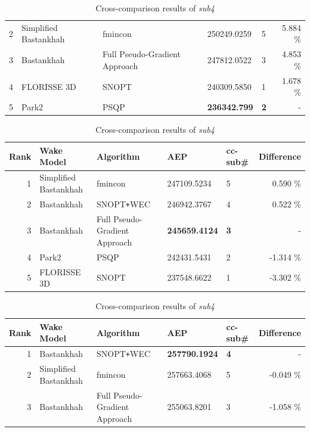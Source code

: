 \begin{table}[htbp]
\begin{center}
\begin{tabular}{r l l l l r}
						2 		& Simplified Bastankhah	& fmincon										& 250249.0259			& 5 		& 5.884 \%\\
						3		& Bastankhah			& Full Pseudo-Gradient Approach					& 247812.0522			& 3 		& 4.853 \%\\
						4		& FLORISSE 3D			& SNOPT											& 240309.5850			& 1 		& 1.678 \%\\
						5		& Park2					& PSQP											& \textbf{236342.799}	& \textbf{2}& - \\
					\hline
				\end{tabular}
			\end{center}
			\begin{center}
			\caption{Cross-comparison results of \textit{sub3}}
			\label{tab:sub3cc}
				\begin{tabular}{r l l l l r}
					\hline
					Rank		& Wake Model 			& Algorithm										& AEP					& cc-sub\#	& Difference	\\
					\hline
						1 		& Simplified Bastankhah	& fmincon										& 247109.5234			& 5 		& 0.590 \%\\	
						2 		& Bastankhah			& SNOPT\texttt{+}WEC 							& 246942.3767			& 4 		& 0.522 \%\\
						3		& Bastankhah			& Full Pseudo-Gradient Approach					& \textbf{245659.4124}	& \textbf{3}& - \\
						4		& Park2					& PSQP											& 242431.5431			& 2 		&-1.314 \%\\
						5		& FLORISSE 3D			& SNOPT											& 237548.6622			& 1 		&-3.302 \%\\
					\hline
				\end{tabular}
			\end{center}
			\begin{center}
			\caption{Cross-comparison results of \textit{sub4}}
			\label{tab:sub4cc}
				\begin{tabular}{r l l l l r}
					\hline
					Rank	& Wake Model 			& Algorithm										& AEP					& cc-sub\#	& Difference	\\
					\hline
						1 	& Bastankhah			& SNOPT\texttt{+}WEC 							& \textbf{257790.1924}	& \textbf{4}& - \\	
						2 	& Simplified Bastankhah	& fmincon										& 257663.4068			& 5 		&-0.049 \%\\
						3	& Bastankhah			& Full Pseudo-Gradient Approach					& 255063.8201			& 3 		&-1.058 \%\\

\end{tabular}
\end{center}
\end{table}
